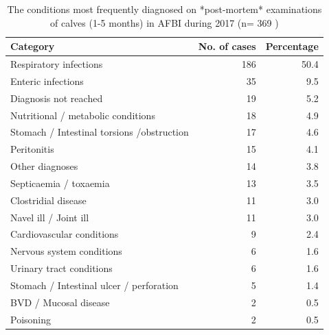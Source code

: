 \documentclass[]{book}
\begin{document}
\begin{table}

\caption{\label{tab:unnamed-chunk-10}The conditions most frequently diagnosed on *post-mortem* examinations of calves (1-5 months) in  AFBI during 2017  (n= 369 )}
\centering
\begin{tabular}[t]{l|r|r}
\hline
Category & No. of cases & Percentage\\
\hline
Respiratory infections & 186 & 50.4\\
\hline
Enteric infections & 35 & 9.5\\
\hline
Diagnosis not reached & 19 & 5.2\\
\hline
Nutritional / metabolic conditions & 18 & 4.9\\
\hline
Stomach / Intestinal torsions /obstruction & 17 & 4.6\\
\hline
Peritonitis & 15 & 4.1\\
\hline
Other diagnoses & 14 & 3.8\\
\hline
Septicaemia / toxaemia & 13 & 3.5\\
\hline
Clostridial disease & 11 & 3.0\\
\hline
Navel ill / Joint ill & 11 & 3.0\\
\hline
Cardiovascular conditions & 9 & 2.4\\
\hline
Nervous system conditions & 6 & 1.6\\
\hline
Urinary tract conditions & 6 & 1.6\\
\hline
Stomach / Intestinal ulcer / perforation & 5 & 1.4\\
\hline
BVD / Mucosal disease & 2 & 0.5\\
\hline
Poisoning & 2 & 0.5\\
\hline
\end{tabular}
\end{table}
\end{document}
